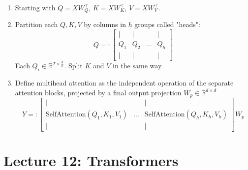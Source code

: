 \documentclass{article}
\begin{document}
\begin{enumerate}
    \item Starting with $Q = X W_Q^\intercal$, $K = X W_K^\intercal$, $V = X W_V^\intercal$.
    \item Partition each $Q, K, V$ by columns in $h$ groups called "heads":
        $$Q=:\begin{bmatrix}
            \vert & \vert &       & \vert\\
            Q_1   & Q_2   & \dots & Q_h  \\
            \vert & \vert &       & \vert
        \end{bmatrix}$$
        Each $Q_i\in\mathbb{R}^{T\times\frac{d}{h}}$. Split $K$ and $V$ in the same way
    \item Define multihead attention as the independent operation of the separate attention blocks, projected by a final output projection $W_p\in\mathbb{R}^{d\times d}$
        $$Y=:\begin{bmatrix}
            \vert &       & \vert\\
            \text{SelfAttention}(Q_1, K_1, V_1)   &  \dots & \text{SelfAttention}(Q_h, K_h, V_h) \\
            \vert &        & \vert
        \end{bmatrix}W_p$$
\end{enumerate}





\section*{Lecture 12: Transformers}
\end{document}

